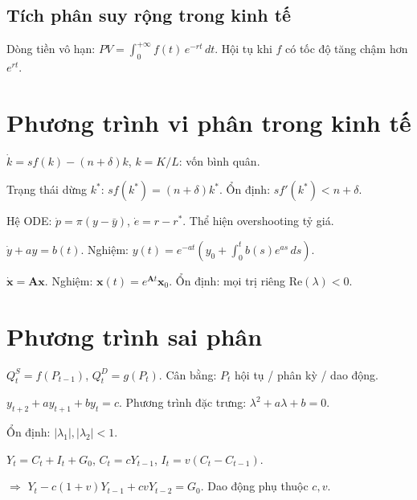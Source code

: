 \documentclass[12pt,a4paper]{article}
\begin{document}
\subsection{Tích phân suy rộng trong kinh tế}

\begin{dinhnghia}
  Dòng tiền vô hạn: $PV = \displaystyle\int_0^{+\infty} f(t)\,e^{-rt}\,dt$. Hội tụ khi $f$ có tốc độ tăng chậm hơn $e^{rt}$.
\end{dinhnghia}

\section{Phương trình vi phân trong kinh tế}

\begin{dinhnghia}[title={Mô hình tăng trưởng Solow}]
  $\dot{k} = sf(k) - (n + \delta)k$, $k = K/L$: vốn bình quân.

  Trạng thái dừng $k^*$: $sf(k^*) = (n + \delta)k^*$. Ổn định: $sf'(k^*) < n + \delta$.
\end{dinhnghia}

\begin{dinhnghia}[title={Mô hình Dornbusch (tỷ giá)}]
  Hệ ODE: $\dot{p} = \pi(y - \bar{y})$, $\dot{e} = r - r^*$. Thể hiện overshooting tỷ giá.
\end{dinhnghia}

\begin{phuongphap}[title={PTVP cấp 1 tuyến tính}]
  $\dot{y} + ay = b(t)$. Nghiệm: $y(t) = e^{-at}\left(y_0 + \int_0^t b(s)e^{as}\,ds\right)$.
\end{phuongphap}

\begin{phuongphap}[title={Hệ PTVP tuyến tính}]
  $\dot{\mathbf{x}} = \mathbf{A}\mathbf{x}$. Nghiệm: $\mathbf{x}(t) = e^{\mathbf{A}t}\mathbf{x}_0$. Ổn định: mọi trị riêng $\text{Re}(\lambda) < 0$.
\end{phuongphap}

\section{Phương trình sai phân}

\begin{dinhnghia}[title={Mô hình cobweb (mạng nhện)}]
  $Q_t^S = f(P_{t-1})$, $Q_t^D = g(P_t)$. Cân bằng: $P_t$ hội tụ / phân kỳ / dao động.
\end{dinhnghia}

\begin{phuongphap}[title={Sai phân bậc 2}]
  $y_{t+2} + ay_{t+1} + by_t = c$. Phương trình đặc trưng: $\lambda^2 + a\lambda + b = 0$.

  Ổn định: $|\lambda_1|, |\lambda_2| < 1$.
\end{phuongphap}

\begin{dinhnghia}[title={Mô hình nhân tử--gia tốc (Samuelson)}]
  $Y_t = C_t + I_t + G_0$, $C_t = cY_{t-1}$, $I_t = v(C_t - C_{t-1})$.

  $\Rightarrow$ $Y_{t} - c(1+v)Y_{t-1} + cvY_{t-2} = G_0$. Dao động phụ thuộc $c, v$.
\end{dinhnghia}
\end{document}

